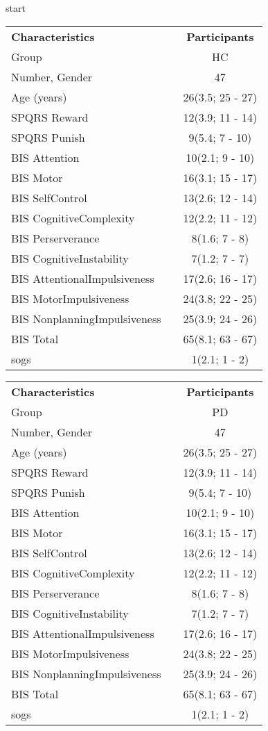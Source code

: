 start
\begin{table}[H]
\begin{subtable}[c]{0.5\textwidth}
\begin{tabular}{ l l c}
\cline{1-3}
\textbf{Characteristics} & & \textbf{Participants}\\
\cline{1-3}
Group & &HC\\Number, Gender & &47\\Age (years) & &26(3.5; 25 - 27)\\SPQRS Reward& &12(3.9; 11 - 14)\\SPQRS Punish& &9(5.4; 7 - 10)\\BIS Attention& &10(2.1; 9 - 10)\\BIS Motor& &16(3.1; 15 - 17)\\BIS SelfControl& &13(2.6; 12 - 14)\\BIS CognitiveComplexity& &12(2.2; 11 - 12)\\BIS Perserverance& &8(1.6; 7 - 8)\\BIS CognitiveInstability& &7(1.2; 7 - 7)\\BIS AttentionalImpulsiveness& &17(2.6; 16 - 17)\\BIS MotorImpulsiveness& &24(3.8; 22 - 25)\\BIS NonplanningImpulsiveness& &25(3.9; 24 - 26)\\BIS Total& &65(8.1; 63 - 67)\\sogs& &1(2.1; 1 - 2)\\\hline
\end{tabular}
\end{subtable}
\begin{subtable}[c]{0.5\textwidth}
\begin{tabular}{ l l c}
\cline{1-3}
\textbf{Characteristics} & & \textbf{Participants}\\
\cline{1-3}
Group & &PD\\Number, Gender & &47\\Age (years) & &26(3.5; 25 - 27)\\SPQRS Reward& &12(3.9; 11 - 14)\\SPQRS Punish& &9(5.4; 7 - 10)\\BIS Attention& &10(2.1; 9 - 10)\\BIS Motor& &16(3.1; 15 - 17)\\BIS SelfControl& &13(2.6; 12 - 14)\\BIS CognitiveComplexity& &12(2.2; 11 - 12)\\BIS Perserverance& &8(1.6; 7 - 8)\\BIS CognitiveInstability& &7(1.2; 7 - 7)\\BIS AttentionalImpulsiveness& &17(2.6; 16 - 17)\\BIS MotorImpulsiveness& &24(3.8; 22 - 25)\\BIS NonplanningImpulsiveness& &25(3.9; 24 - 26)\\BIS Total& &65(8.1; 63 - 67)\\sogs& &1(2.1; 1 - 2)\\\hline

\end{tabular}
\end{subtable}
\end{table}
